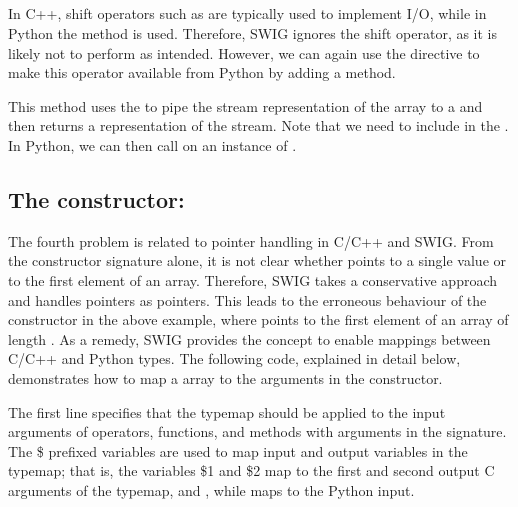 \subsection{ }%
In C++, shift operators such as  are typically used to implement I/O, while in
Python the  method is used.    
Therefore, SWIG ignores the shift operator, as it is likely not to perform as intended. 
However, we can again use the  directive to make this
operator available from Python by adding a   method.
This method uses the  %
to pipe the stream representation of the array to a
 and then returns a 
representation of the stream.
Note that we need to include  in the .
In Python, we can then call  on an instance of .

\subsection{The constructor: }
The fourth problem is related to pointer handling in C/C++ and SWIG. From
the constructor signature alone, it is not clear whether  points to a single value or to the first element of an array.
Therefore, SWIG takes a conservative approach and handles pointers as
pointers. This leads to the erroneous behaviour of the constructor in the
above example, where   points to the first element of an array of length . 
As a remedy, SWIG provides the  concept to enable mappings
between C/C++ and Python types. The following code, explained in detail
below, demonstrates how to map a \numpy array to the  
arguments in the constructor.
The first line specifies that the typemap should be applied to the input
 arguments of operators, functions, and methods with 
 arguments in the signature. 
The \$ prefixed variables are used to map input and output variables in the typemap; 
that is, the variables \$1 and \$2 map to the first and second output C
arguments of the typemap,  and , while 
maps to the Python input. 

